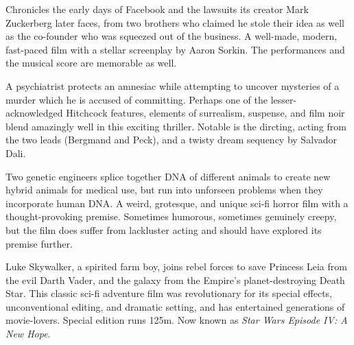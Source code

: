    Chronicles the early days of Facebook and the lawsuits its creator Mark Zuckerberg later faces, from two brothers who claimed he stole their idea as well as the co-founder who was squeezed out of the business. A well-made, modern, fast-paced film with a stellar screenplay by Aaron Sorkin. The performances and the musical score are memorable as well. \author{DW} 

\iffalse
\movie{Sound of Music, The}{1965}{174m}{\threehalf}
\fi

   A psychiatrist protects an amnesiac while attempting to uncover mysteries of a murder which he is accused of committing. Perhaps one of the lesser-acknowledged Hitchcock features, elements of surrealism, suspense, and film noir blend amazingly well in this exciting thriller. Notable is the dircting, acting from the two leads (Bergmand and Peck), and a twisty dream sequency by Salvador Dali. \author{AW}

   Two genetic engineers splice together DNA of different animals to create new hybrid animals for medical use, but run into unforseen problems when they incorporate human DNA. A weird, grotesque, and unique sci-fi horror film with a thought-provoking premise. Sometimes humorous, sometimes genuinely creepy, but the film does suffer from lackluster acting and should have explored its premise further. \author{DW} 

   Luke Skywalker, a spirited farm boy, joins rebel forces to save Princess Leia from the evil Darth Vader, and the galaxy from the Empire's planet-destroying Death Star. This classic sci-fi adventure film was revolutionary for its special effects, unconventional editing, and dramatic setting, and has entertained generations of movie-lovers. Special edition runs 125m. Now known as \textit{Star Wars Episode IV: A New Hope}. \author{DW} 

